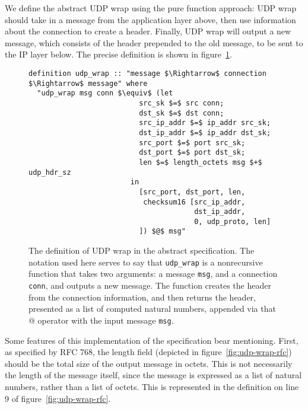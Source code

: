 \documentclass[twoside]{memoir}
\begin{document}
We define the abstract UDP wrap using the pure function approach:
UDP wrap should take in a message from the application layer above,
then use information about the connection to create a header.
Finally, UDP wrap will output a new message, which consists of the header
prepended to the old message, to be sent to the IP layer below.
The precise definition is shown in figure~\ref{fig:wrap-abstract}.

\begin{figure}[htpb]
    \centering
\begin{lstlisting}[language=isabelle]
definition udp_wrap :: "message $\Rightarrow$ connection $\Rightarrow$ message" where
  "udp_wrap msg conn $\equiv$ (let
                          src_sk $=$ src conn;
                          dst_sk $=$ dst conn;
                          src_ip_addr $=$ ip_addr src_sk;
                          dst_ip_addr $=$ ip_addr dst_sk;
                          src_port $=$ port src_sk;
                          dst_port $=$ port dst_sk;
                          len $=$ length_octets msg $+$ udp_hdr_sz
                        in
                          [src_port, dst_port, len,
                           checksum16 [src_ip_addr,
                                       dst_ip_addr,
                                       0, udp_proto, len]
                          ]) $@$ msg"
\end{lstlisting}
    \caption{The definition of UDP wrap in the abstract specification.
        The notation used here serves to say that \lstinline{udp_wrap}
        is a nonrecursive function that takes two arguments:
        a message \lstinline{msg}, and a connection \lstinline{conn},
        and outputs a new message.
        The function creates the header from the connection information,
        and then returns
        the header, presented as a list of computed natural numbers,
        appended via that $@$ operator with the input message
        \lstinline{msg}.
    }
    \label{fig:wrap-abstract}
\end{figure}

Some features of this implementation of the specification bear mentioning.
First, as specified by RFC 768, the length field (depicted in figure~\ref{fig:udp-wrap-rfc}) should be the total size of the output message in octets.
This is not necessarily the length of the message itself,
since the message is expressed as a list of natural numbers, rather than
a list of octets.
This is represented in the definition on line 9 of figure~\ref{fig:udp-wrap-rfc}.
\end{document}
